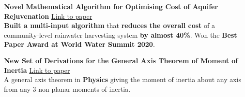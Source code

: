 \documentclass[letterpaper,10pt]{article}
\newcommand{\entry}[3]{%
  \textbf{#1} \hfill #2 \\[1pt]
  #3\par\vspace{2pt}}
\begin{document}
\entry{Novel Mathematical Algorithm for Optimising Cost of Aquifer Rejuvenation}{\href{https://www.researchgate.net/publication/380000939_Novel_mathematical_model_for_optimizing_the_cost_of_aquifer_rejuvenation_via_community-level_groundwater_recharge}{Link to paper}}{%
\textbf{Built a multi-input algorithm} that \textbf{reduces the overall cost} of a community-level rainwater harvesting system \textbf{by almost 40\%}. Won the \textbf{Best Paper Award at World Water Summit 2020}.}

\entry{New Set of Derivations for the General Axis Theorem of Moment of Inertia}{\href{https://www.researchgate.net/publication/380000942_New_set_of_derivation_for_general_axis_theorem_for_moment_of_Inertia}{Link to paper}}{%
A general axis theorem in \textbf{Physics} giving the moment of inertia about any axis from any 3 non-planar moments of inertia.}
\end{document}
